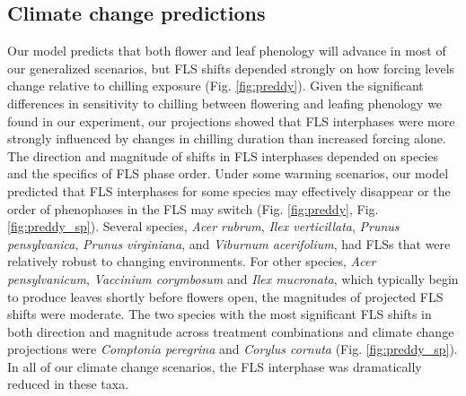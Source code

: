 \documentclass[11pt]{article}\usepackage[]{graphicx}\usepackage[]{color}
\begin{document}
\subsection*{Climate change predictions}
\noindent Our model predicts  that both flower and leaf phenology will advance in most of our generalized scenarios, but FLS shifts depended strongly on how forcing levels change relative to chilling exposure (Fig. \ref{fig:preddy}). Given the significant differences in sensitivity to chilling between flowering and leafing phenology we found in our experiment, our projections showed that FLS interphases were more strongly influenced by changes in chilling duration than increased forcing alone.\\ 

\noindent The direction and magnitude of shifts in FLS interphases depended on species and the specifics of FLS phase order. Under some warming scenarios, our model predicted that  FLS interphases for some species may effectively disappear or the order of phenophases in the FLS may switch (Fig. \ref{fig:preddy}, Fig. \ref{fig:preddy_sp}). Several species, \textit{Acer rubrum}, \textit{Ilex verticillata}, \textit{Prunus pensylvanica}, \textit{Prunus virginiana}, and \textit{Viburnum acerifolium}, had FLSs that were relatively robust to changing environments. For other species, \textit{Acer pensylvanicum}, \textit{Vaccinium corymbosum} and \textit{Ilex mucronata}, which typically begin to produce leaves shortly before flowers open, the magnitudes of projected FLS shifts were moderate. The two species with the most significant FLS shifts in both direction and magnitude across treatment combinations and climate change projections were \textit{Comptonia peregrina} and \textit{Corylus cornuta} (Fig. \ref{fig:preddy_sp}). In all of our climate change scenarios, the FLS interphase was dramatically reduced in these taxa.\\
\end{document}
